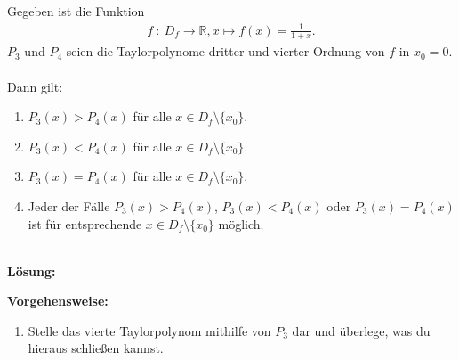 \subsection*{}
Gegeben ist die Funktion
\begin{align*}
f \ : \ D_f  \to \mathbb{R}, x \mapsto f(x) = \frac{1}{1+x}.
\end{align*}
$ P_3 $ und $ P_4 $ seien die Taylorpolynome dritter und vierter Ordnung von $ f $ in $ x_0 = 0 $.\\
\\
Dann gilt:
\renewcommand{\labelenumi}{(\alph{enumi})}
\begin{enumerate}
	\item 
	$ P_3(x) > P_4(x) $ für alle $ x \in D_f \setminus \{ x_0\} $.
	\item
	$ P_3(x) < P_4(x) $ für alle $ x \in D_f \setminus \{ x_0\} $.
	\item
	$ P_3(x) = P_4(x) $ für alle $ x \in D_f \setminus \{ x_0\} $.
	\item
	Jeder der Fälle $ P_3(x) > P_4(x) $, $ P_3(x) < P_4(x) $ oder $ P_3(x) = P_4(x) $ ist für entsprechende $ x \in D_f \setminus \{ x_0\} $ möglich.
\end{enumerate}
\ \\
\textbf{Lösung:}
\begin{mdframed}
\underline{\textbf{Vorgehensweise:}}
\renewcommand{\labelenumi}{\theenumi.}
\begin{enumerate}
\item Stelle das vierte Taylorpolynom mithilfe von $ P_3 $ dar und überlege, was du hieraus schließen kannst.
\end{enumerate}
\end{mdframed}

